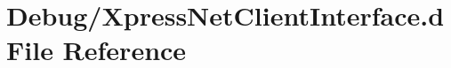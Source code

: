 \hypertarget{Debug_2XpressNetClientInterface_8d}{}\section{Debug/\+Xpress\+Net\+Client\+Interface.d File Reference}
\label{Debug_2XpressNetClientInterface_8d}
